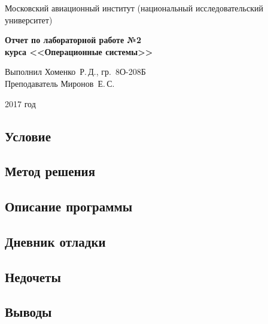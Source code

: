 \documentclass[12pt]{article}
\begin{document}
\begin{titlepage}
\vfill

\begin{center}
    {Московский авиационный институт
     (национальный исследовательский университет)}
\end{center}

\vspace{40mm}
\thispagestyle{empty}

\begin{center}
    \Large{\textbf{Отчет по лабораторной работе №2}} \\
    \Large{\textbf{курса <<Операционные системы>>}}
\end{center}

\vspace{11cm}

\begin{flushright}
\begin{minipage}{0,45\textwidth}
\begin{flushleft}
    Выполнил Хоменко~Р.\,Д., гр.~8О-208Б \\
    Преподаватель Миронов~Е.\,С.
\end{flushleft}
\end{minipage}
\end{flushright}

\vspace{30mm}
\begin{center}
2017 год
\end{center}

\end{titlepage}

\newpage

\subsection*{Условие}

\subsection*{Метод решения}

\subsection*{Описание программы}

\subsection*{Дневник отладки}

\subsection*{Недочеты}

\subsection*{Выводы}
\end{document}
